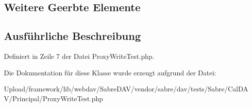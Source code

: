 \subsection*{Weitere Geerbte Elemente}


\subsection{Ausführliche Beschreibung}


Definiert in Zeile 7 der Datei Proxy\+Write\+Test.\+php.



Die Dokumentation für diese Klasse wurde erzeugt aufgrund der Datei\+:\begin{DoxyCompactItemize}
\item 
Upload/framework/lib/webdav/\+Sabre\+D\+A\+V/vendor/sabre/dav/tests/\+Sabre/\+Cal\+D\+A\+V/\+Principal/Proxy\+Write\+Test.\+php\end{DoxyCompactItemize}
